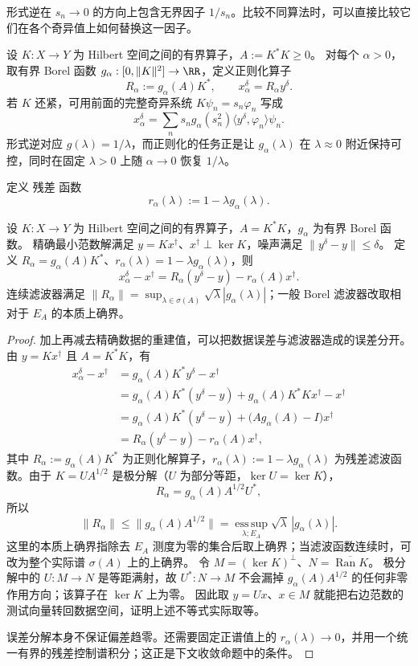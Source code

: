 \label{sec:inverse-spectral-filter}




形式逆在 $s_n\to0$ 的方向上包含无界因子 $1/s_n$。比较不同算法时，可以直接比较它们在各个奇异值上如何替换这一因子。

设 $K:X\to Y$ 为 Hilbert 空间之间的有界算子，$A:=K^*K\ge0$。
对每个 $\alpha>0$，取有界 Borel 函数 $g_\alpha:[0,\|K\|^2]\to\RR$，定义正则化算子
\[
\boxed{
R_\alpha
:=g_\alpha(A)K^*
},
\qquad
x_\alpha^\delta=R_\alpha y^\delta.
\]
若 $K$ 还紧，可用前面的完整奇异系统 $K\psi_n=s_n\varphi_n$ 写成
\[
x_\alpha^\delta
=\sum_n s_ng_\alpha(s_n^2)
\langle y^\delta,\varphi_n\rangle\psi_n.
\]
形式逆对应 $g(\lambda)=1/\lambda$，而正则化的任务正是让 $g_\alpha(\lambda)$ 在 $\lambda\approx0$ 附近保持可控，同时在固定 $\lambda>0$ 上随 $\alpha\to0$ 恢复 $1/\lambda$。

定义 残差 函数
\[
r_\alpha(\lambda)
:=1-\lambda g_\alpha(\lambda).
\]
\begin{proposition}[谱滤波误差的偏差与噪声分解]
设 $K:X\to Y$ 为 Hilbert 空间之间的有界算子，$A=K^*K$，$g_\alpha$ 为有界 Borel 函数。
精确最小范数解满足 $y=Kx^\dagger$、$x^\dagger\perp\ker K$，噪声满足 $\|y^\delta-y\|\le\delta$。
定义 $R_\alpha=g_\alpha(A)K^*$、$r_\alpha(\lambda)=1-\lambda g_\alpha(\lambda)$，则
\[
x_\alpha^\delta-x^\dagger=R_\alpha(y^\delta-y)-r_\alpha(A)x^\dagger.
\]
连续滤波器满足 $\|R_\alpha\|=\sup_{\lambda\in\sigma(A)}\sqrt\lambda|g_\alpha(\lambda)|$；一般 Borel 滤波器改取相对于 $E_A$ 的本质上确界。
\end{proposition}
\begin{proof}
加上再减去精确数据的重建值，可以把数据误差与滤波器造成的误差分开。由 $y=Kx^\dagger$ 且 $A=K^*K$，有
\[
\begin{aligned}
x_\alpha^\delta-x^\dagger
&=g_\alpha(A)K^*y^\delta-x^\dagger\\
&=g_\alpha(A)K^*(y^\delta-y)
+g_\alpha(A)K^*Kx^\dagger-x^\dagger\\
&=g_\alpha(A)K^*(y^\delta-y)
+\bigl(A g_\alpha(A)-I\bigr)x^\dagger\\
&=R_\alpha(y^\delta-y)
-r_\alpha(A)x^\dagger,
\end{aligned}
\]
其中 $R_\alpha:=g_\alpha(A)K^*$ 为正则化解算子，$r_\alpha(\lambda):=1-\lambda g_\alpha(\lambda)$ 为残差滤波函数。由于 $K=U A^{1/2}$ 是极分解（$U$ 为部分等距，$\ker U=\ker K$），
\[
R_\alpha
=g_\alpha(A)A^{1/2}U^*,
\]
所以
\[
\|R_\alpha\|
\le
\|g_\alpha(A)A^{1/2}\|
=
\operatorname*{ess\,sup}_{\lambda;E_A}
\sqrt\lambda\,|g_\alpha(\lambda)|.
\]
这里的本质上确界指除去 $E_A$ 测度为零的集合后取上确界；当滤波函数连续时，可改为整个实际谱 $\sigma(A)$ 上的上确界。
令 $M=(\ker K)^\perp$、$N=\overline{\operatorname{Ran}K}$。
极分解中的 $U:M\to N$ 是等距满射，故 $U^*:N\to M$ 不会漏掉 $g_\alpha(A)A^{1/2}$ 的任何非零作用方向；该算子在 $\ker K$ 上为零。
因此取 $y=Ux$、$x\in M$ 就能把右边范数的测试向量转回数据空间，证明上述不等式实际取等。

误差分解本身不保证偏差趋零。还需要固定正谱值上的 $r_\alpha(\lambda)\to0$，并用一个统一有界的残差控制谱积分；这正是下文收敛命题中的条件。
\end{proof}

